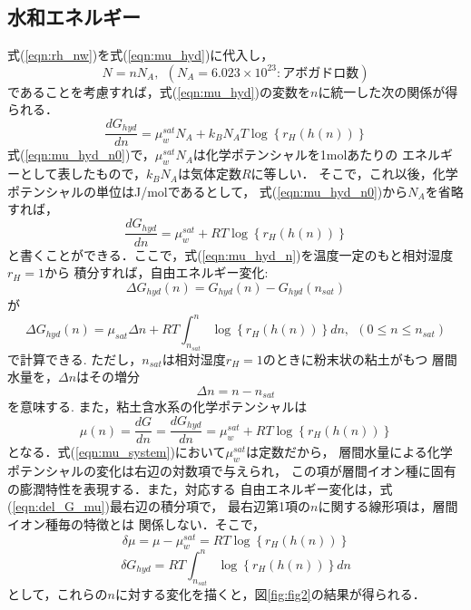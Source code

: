\subsection{水和エネルギー}
式(\ref{eqn:rh_nw})を式(\ref{eqn:mu_hyd})に代入し，
\begin{equation}
	N=nN_A, \ \ (N_A=6.023\times 10^{23}:アボガドロ数)
	\label{eqn:}
\end{equation}
であることを考慮すれば，式(\ref{eqn:mu_hyd})の変数を\(n\)に統一した次の関係が得られる．
\begin{equation}
	\frac{d G_{hyd}}{d n}
	=
	\mu_w^{sat}N_A +k_BN_AT \log \left\{ r_H(h(n)) \right\}
	\label{eqn:mu_hyd_n0}
\end{equation}
式(\ref{eqn:mu_hyd_n0})で，\(\mu_w^{sat}N_A\)は化学ポテンシャルを1molあたりの
エネルギーとして表したもので，\(k_B N_A\)は気体定数\(R\)に等しい．
そこで，これ以後，化学ポテンシャルの単位はJ/molであるとして，
式(\ref{eqn:mu_hyd_n0})から\(N_A\)を省略すれば，
\begin{equation}
	\frac{d G_{hyd}}{d n}
	=
	\mu_w^{sat} +RT \log \left\{ r_H(h(n)) \right\}
	\label{eqn:mu_hyd_n}
\end{equation}
と書くことができる．ここで，式(\ref{eqn:mu_hyd_n})を温度一定のもと相対湿度$r_H=1$から
積分すれば，自由エネルギー変化:
\begin{equation}
	\Delta G_{hyd}(n) = G_{hyd}(n)-G_{hyd}(n_{sat})
	\label{eqn:del_G}
\end{equation}
が
\begin{equation}
	\Delta G_{hyd}(n)
	=
	\mu_{sat}\Delta n
	+
	RT
	\int_{n_{sat}}^{n} \log \left\{ r_H(h(n))\right\} dn, \ \ (0 \leq n \leq n_{sat})
	\label{eqn:del_G_mu}
\end{equation}
で計算できる. ただし，\(n_{sat}\)は相対湿度\(r_H=1\)のときに粉末状の粘土がもつ
層間水量を，\(\Delta n\)はその増分
\begin{equation}
	\Delta n = n-n_{sat}
\end{equation}
を意味する. また，粘土含水系の化学ポテンシャルは
\begin{equation}
	\mu(n)
	=
	\frac{d G}{d n}
	=
	\frac{d G_{hyd}}{d n}
	=
	\mu_w^{sat} +RT \log \left\{ r_H(h(n)) \right\}
	\label{eqn:mu_system}
\end{equation}
となる．式(\ref{eqn:mu_system})において$\mu_w^{sat}$は定数だから，
層間水量による化学ポテンシャルの変化は右辺の対数項で与えられ，
この項が層間イオン種に固有の膨潤特性を表現する．また，対応する
自由エネルギー変化は，式(\ref{eqn:del_G_mu})最右辺の積分項で，
最右辺第1項の\(n\)に関する線形項は，層間イオン種毎の特徴とは
関係しない．そこで，
\begin{equation}
	\delta \mu = \mu-\mu_{w}^{sat}
	=
	RT \log \left\{ r_H(h(n))\right\}
\end{equation}
\begin{equation}
	\delta G_{hyd} =
	RT
	\int_{n_{sat}}^{n} \log \left\{ r_H(h(n))\right\} dn
\end{equation}
として，これらの\(n\)に対する変化を描くと，図\ref{fig:fig2}の結果が得られる．


